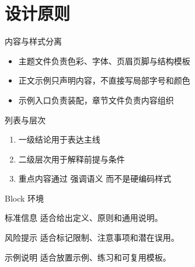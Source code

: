 \section{设计原则}

\begin{frame}{内容与样式分离}
  \begin{itemize}
    \item 主题文件负责色彩、字体、页眉页脚与结构模板
    \item 正文示例只声明内容，不直接写局部字号和颜色
    \item 示例入口负责装配，章节文件负责内容组织
  \end{itemize}
\end{frame}

\begin{frame}{列表与层次}
  \begin{enumerate}
    \item 一级结论用于表达主线
    \item 二级层次用于解释前提与条件
    \item 重点内容通过 \alert{强调语义} 而不是硬编码样式
  \end{enumerate}
\end{frame}

\begin{frame}{Block 环境}
  \begin{block}{标准信息}
    适合给出定义、原则和通用说明。
  \end{block}
  \begin{alertblock}{风险提示}
    适合标记限制、注意事项和潜在误用。
  \end{alertblock}
  \begin{exampleblock}{示例说明}
    适合放置示例、练习和可复用模板。
  \end{exampleblock}
\end{frame}
